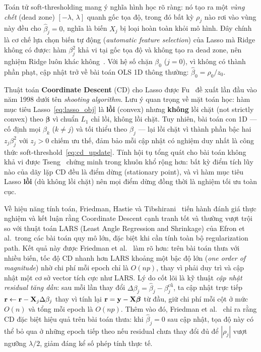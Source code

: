 Toán tử soft-thresholding mang ý nghĩa hình học rõ ràng: nó tạo ra một
\textit{vùng chết} (dead zone) $[-\lambda,\,\lambda]$ quanh gốc tọa độ, trong đó bất kỳ
$\rho_j$ nào rơi vào vùng này đều cho $\hat{\beta}_j = 0$, nghĩa là biến $X_j$ bị loại
hoàn toàn khỏi mô hình. Đây chính là cơ chế lựa chọn biến tự động
(\textit{automatic feature selection}) của Lasso mà Ridge không có được: hàm $\beta_j^2$
khả vi tại gốc tọa độ và không tạo ra dead zone, nên nghiệm Ridge luôn khác
không~\cite{tibshirani1996, james2013}. Với hệ số chặn $\beta_0$ ($j = 0$), vì không
có thành phần phạt, cập nhật trở về bài toán OLS 1D thông thường:
$\hat{\beta}_0 = \rho_0 / z_0$.


Thuật toán \textbf{Coordinate Descent} (CD) cho Lasso được Fu~\cite{fu1998} đề xuất lần
đầu vào năm 1998 dưới tên \textit{shooting algorithm}. Lưu ý quan trọng về mặt toán học:
hàm mục tiêu Lasso~\eqref{eq:lasso_obj} là \textbf{lồi} (convex) nhưng \textbf{không} lồi
chặt (not strictly convex) theo $\boldsymbol{\beta}$ vì chuẩn $L_1$ chỉ lồi, không lồi
chặt. Tuy nhiên, bài toán con 1D --- cố định mọi $\beta_k$ ($k\neq j$) và tối thiểu
theo $\beta_j$ --- lại lồi chặt vì thành phần bậc hai $z_j\beta_j^2$ với $z_j > 0$ chiếm
ưu thế, đảm bảo mỗi cập nhật có nghiệm duy nhất là công thức soft-threshold~\eqref{eq:cd_update}.
Tính hội tụ tổng quát cho bài toán không khả vi được Tseng~\cite{tseng2001} chứng minh
trong khuôn khổ rộng hơn: bất kỳ điểm tích lũy nào của dãy lặp CD đều là điểm dừng
(stationary point), và vì hàm mục tiêu Lasso \textbf{lồi} (dù không lồi chặt) nên mọi
điểm dừng đồng thời là nghiệm tối ưu toàn cục.

Về hiệu năng tính toán, Friedman, Hastie và Tibshirani~\cite{friedman2010} tiến hành đánh
giá thực nghiệm và kết luận rằng Coordinate Descent cạnh tranh tốt và thường vượt trội
so với thuật toán LARS (Least Angle Regression and Shrinkage) của Efron et al.\ trong các
bài toán quy mô lớn, đặc biệt khi cần tính toàn bộ regularization path. Kết quả này
được Friedman et al.~\cite{friedman2007} làm rõ hơn: trên bài toán thưa với nhiều biến,
tốc độ CD nhanh hơn LARS khoảng một bậc độ lớn (\textit{one order of magnitude}) nhờ
chi phí mỗi epoch chỉ là $O(np)$, thay vì phải duy trì và cập nhật một cơ sở vector tích
cực như LARS. Lý do cốt lõi là kỹ thuật \textit{cập nhật residual tăng dần}: sau mỗi
lần thay đổi $\Delta\beta_j = \hat{\beta}_j - \beta_j^{\text{cũ}}$, ta cập nhật trực tiếp
$\mathbf{r} \leftarrow \mathbf{r} - \mathbf{X}_j\Delta\beta_j$ thay vì tính lại
$\mathbf{r} = \mathbf{y} - \mathbf{X}\boldsymbol{\beta}$ từ đầu, giữ chi phí mỗi cột ở mức $O(n)$
và tổng mỗi epoch là $O(np)$. Thêm vào đó, Friedman et al.~\cite{friedman2010} chỉ ra
rằng CD đặc biệt hiệu quả trên bài toán thưa: khi $\hat{\beta}_j = 0$ sau cập nhật, tọa
độ này có thể bỏ qua ở những epoch tiếp theo nếu residual chưa thay đổi đủ để $|\rho_j|$
vượt ngưỡng $\lambda/2$, giảm đáng kể số phép tính thực tế.

